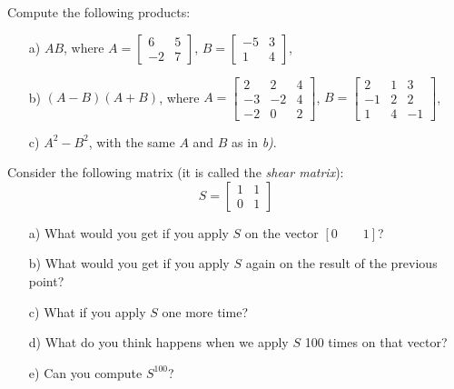     \medskip
    \begin{problem}
        
Compute the following products:

    \begin{enumerate}
        \item[a) ] $AB$, where $A=\begin{bmatrix}
        6&5\\-2&7  \end{bmatrix}$, $B=\begin{bmatrix}
        -5&3\\1&4   \end{bmatrix}$,

        \item[b) ]  $(A-B)(A+B)$, where $A=\begin{bmatrix}
        2&2&4\\-3&-2&4\\-2&0&2   \end{bmatrix}$, $B=\begin{bmatrix}
        2&1&3\\-1&2&2\\1&4&-1   \end{bmatrix}$,
        
        \item[c) ] $A^2 - B^2$, with the same $A$ and $B$ as in \textit{b)}.
    \end{enumerate}
\end{problem}

\medskip




\begin{problem}%
    Consider the following matrix (it is called the \textit{shear matrix}):
    \[
    S = \begin{bmatrix}
        1 & 1 \\ 0 & 1
    \end{bmatrix}
    \]
    \begin{enumerate}
        \item[a) ] What would you get if you apply $S$ on the vector $[0 \qquad 1]$?
        
        \item[b) ] What would you get if you apply $S$ again on the result of the previous point?

        \item[c) ] What if you apply $S$ one more time?

        \item[d) ] What do you think happens when we apply $S$ 100 times on that vector?

        \item[e) ] Can you compute $S^{100}$?
        
        
    \end{enumerate}

\end{problem}

